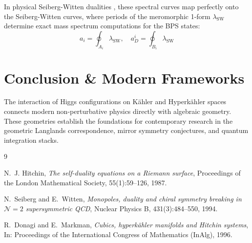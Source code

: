 \documentclass[11pt,a4paper]{article}
\begin{document}
In physical Seiberg-Witten dualities \cite{seiberg1994}, these spectral curves map perfectly onto the Seiberg-Witten curves, where periods of the meromorphic 1-form $\lambda_{\text{SW}}$ determine exact mass spectrum computations for the BPS states:
\begin{equation}
    a_i = \oint_{A_i} \lambda_{\text{SW}}, \quad a_D^i = \oint_{B_i} \lambda_{\text{SW}}
\end{equation}

\section{Conclusion \& Modern Frameworks}
The interaction of Higgs configurations on K\"ahler and Hyperk\"ahler spaces connects modern non-perturbative physics directly with algebraic geometry. These geometries establish the foundations for contemporary research in the geometric Langlands correspondence, mirror symmetry conjectures, and quantum integration stacks.

\begin{thebibliography}{9}

N.~J. Hitchin,
\textit{The self-duality equations on a Riemann surface},
Proceedings of the London Mathematical Society, 55(1):59--126, 1987.

N.~Seiberg and E.~Witten,
\textit{Monopoles, duality and chiral symmetry breaking in $\mathcal{N}=2$ supersymmetric QCD},
Nuclear Physics B, 431(3):484--550, 1994.

R.~Donagi and E.~Markman,
\textit{Cubics, hyperkähler manifolds and Hitchin systems},
In: Proceedings of the International Congress of Mathematics (InAlg), 1996.

\end{thebibliography}
\end{document}
